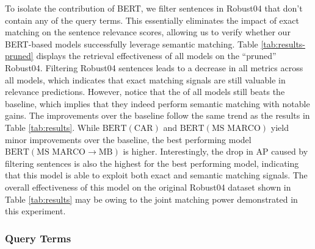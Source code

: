 To isolate the contribution of BERT, we filter sentences in Robust04 that don't contain any of the query terms.
This essentially eliminates the impact of exact matching on the sentence relevance scores, allowing us to verify whether our BERT-based models successfully leverage semantic matching.
Table \ref{tab:results-pruned} displays the retrieval effectiveness of all models on the ``pruned'' Robust04.
Filtering Robust04 sentences leads to a decrease in all metrics across all models, which indicates that exact matching signals are still valuable in relevance predictions.
However, notice that the  of all models still beats the baseline, which implies that they indeed perform semantic matching with notable gains.
The improvements over the baseline follow the same trend as the results in Table \ref{tab:results}.
While $ \textrm{BERT} (\textrm{CAR}) $ and $ \textrm{BERT} (\textrm{MS MARCO}) $ yield minor improvements over the baseline, the best performing model $ \textrm{BERT} (\textrm{MS MARCO}\rightarrow\textrm{MB}) $ is  higher.
Interestingly, the drop in AP caused by filtering sentences is also the highest for the best performing model, indicating that this model is able to exploit both exact and semantic matching signals.
The overall effectiveness of this model on the original Robust04 dataset shown in Table \ref{tab:results} may be owing to the joint matching power demonstrated in this experiment.

\subsubsection{Query Terms}

\begin{table*}[t!]
\centering{
\begin{tabular}{lll lllll}
\toprule
 & \multicolumn{5}{c}{\textbf{Fraction of Query Term}} \\
 \cmidrule(lr){2-6}
{\bf Model} & {\bf [0.0, 0.01)} & {\bf [0.01, 0.02)} & {\bf [0.02, 0.03)} \\
\toprule
BM25+RM3 &  \\
\midrule
$ \textrm{BERT}(\textrm{MB}) $ &  \\
\midrule
$ \textrm{BERT}(\textrm{CAR}) $ &  \\
\midrule
$ \textrm{BERT}(\textrm{MS MARCO}) $ &  \\
\midrule
$ \textrm{BERT}(\textrm{CAR}\rightarrow\textrm{MB}) $ &   \\
\midrule
$ \textrm{BERT}(\textrm{MS MARCO}\rightarrow\textrm{MB}) $ &  \\
\bottomrule
\end{tabular}
}
\caption{}
\label{tab:results-query-terms}
\end{table*}

